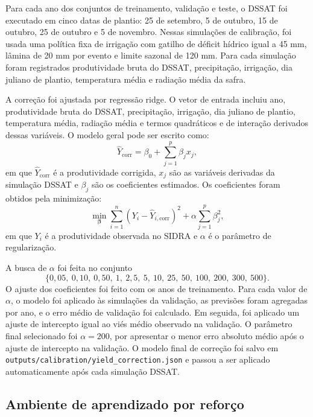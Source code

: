 Para cada ano dos conjuntos de treinamento, validação e teste, o DSSAT foi
executado em cinco datas de plantio: 25 de setembro, 5 de outubro, 15 de
outubro, 25 de outubro e 5 de novembro. Nessas simulações de calibração, foi
usada uma política fixa de irrigação com gatilho de déficit hídrico igual a
45 mm, lâmina de 20 mm por evento e limite sazonal de 120 mm. Para cada
simulação foram registrados produtividade bruta do DSSAT, precipitação,
irrigação, dia juliano de plantio, temperatura média e radiação média da safra.

A correção foi ajustada por regressão ridge. O vetor de entrada incluiu ano,
produtividade bruta do DSSAT, precipitação, irrigação, dia juliano de plantio,
temperatura média, radiação média e termos quadráticos e de interação derivados
dessas variáveis. O modelo geral pode ser escrito como:
\begin{equation}
    \hat{Y}_{\mathrm{corr}} =
    \beta_0 + \sum_{j=1}^{p} \beta_j x_j,
\end{equation}
em que $\hat{Y}_{\mathrm{corr}}$ é a produtividade corrigida, $x_j$ são as
variáveis derivadas da simulação DSSAT e $\beta_j$ são os coeficientes estimados.
Os coeficientes foram obtidos pela minimização:
\begin{equation}
    \min_{\boldsymbol{\beta}}
    \sum_{i=1}^{n}
    \left(Y_i - \hat{Y}_{i,\mathrm{corr}}\right)^2
    + \alpha \sum_{j=1}^{p}\beta_j^2,
\end{equation}
em que $Y_i$ é a produtividade observada no SIDRA e $\alpha$ é o parâmetro de
regularização.

A busca de $\alpha$ foi feita no conjunto
\[
\{0{,}05,\ 0{,}10,\ 0{,}50,\ 1,\ 2{,}5,\ 5,\ 10,\ 25,\ 50,\ 100,\ 200,\ 300,\ 500\}.
\]
O ajuste dos coeficientes foi feito com os anos de treinamento. Para cada valor
de $\alpha$, o modelo foi aplicado às simulações da validação, as previsões foram
agregadas por ano, e o erro médio de validação foi calculado. Em seguida, foi
aplicado um ajuste de intercepto igual ao viés médio observado na validação. O
parâmetro final selecionado foi $\alpha = 200$, por apresentar o menor erro
absoluto médio após o ajuste de intercepto na validação. O modelo final de
correção foi salvo em \texttt{outputs/calibration/yield\_correction.json} e
passou a ser aplicado automaticamente após cada simulação DSSAT.

\subsection{Ambiente de aprendizado por reforço}
\label{subsec:ambiente_rl}

